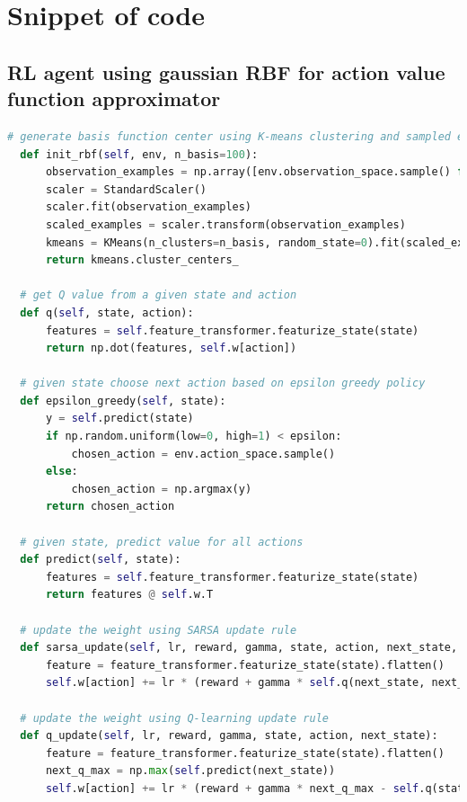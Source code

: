 \documentclass[12pt,letterpaper]{article}
\begin{document}
\newpage
\appendix
\section{Snippet of code}
\subsection{RL agent using gaussian RBF for action value function approximator}
\label{rl-code}
\begin{lstlisting}[language=Python]
  # generate basis function center using K-means clustering and sampled environment states.
  def init_rbf(self, env, n_basis=100):
      observation_examples = np.array([env.observation_space.sample() for x in range(10000)])
      scaler = StandardScaler()
      scaler.fit(observation_examples)
      scaled_examples = scaler.transform(observation_examples)
      kmeans = KMeans(n_clusters=n_basis, random_state=0).fit(scaled_examples)
      return kmeans.cluster_centers_
  
  # get Q value from a given state and action
  def q(self, state, action):
      features = self.feature_transformer.featurize_state(state)
      return np.dot(features, self.w[action])
  
  # given state choose next action based on epsilon greedy policy
  def epsilon_greedy(self, state):
      y = self.predict(state)
      if np.random.uniform(low=0, high=1) < epsilon:
          chosen_action = env.action_space.sample()
      else:
          chosen_action = np.argmax(y)
      return chosen_action
  
  # given state, predict value for all actions 
  def predict(self, state):
      features = self.feature_transformer.featurize_state(state)
      return features @ self.w.T
  
  # update the weight using SARSA update rule
  def sarsa_update(self, lr, reward, gamma, state, action, next_state, next_action):
      feature = feature_transformer.featurize_state(state).flatten()
      self.w[action] += lr * (reward + gamma * self.q(next_state, next_action) - self.q(state, action)) * feature
  
  # update the weight using Q-learning update rule
  def q_update(self, lr, reward, gamma, state, action, next_state):
      feature = feature_transformer.featurize_state(state).flatten()
      next_q_max = np.max(self.predict(next_state))
      self.w[action] += lr * (reward + gamma * next_q_max - self.q(state, action)) * feature
    \end{lstlisting}
\end{document}
